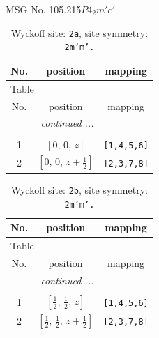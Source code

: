 \documentclass[fleqn,8pt]{jsarticle}
\begin{document}
\setcounter{MaxMatrixCols}{32}

\renewcommand{\tablename}{Table~}
\renewcommand{\figurename}{Figure~}
\begin{center}
\LARGE
MSG No. 105.215\quad$P4_{2}m'c'$
\end{center}
\renewcommand{\arraystretch}{1.2}
\begin{longtable}{ccc}
\caption{Wyckoff site: {\tt 2a}, site symmetry: {\tt 2m'm'.}}
 \\
 \hline \hline
No. & position & mapping \\ \hline \endfirsthead

\multicolumn{2}{l}{\tablename\ \thetable{}} \\
 \hline \hline
No. & position & mapping \\ \hline \endhead

 \hline \hline
\multicolumn{2}{r}{\footnotesize\it continued ...} \\ \endfoot

 \hline \hline
\multicolumn{2}{r}{} \\ \endlastfoot

1 & $\left[ 0,\, 0,\, z \right]$ & {\tt [1,4,5,6]} \\ \hline
2 & $\left[ 0,\, 0,\, z + \frac{1}{2} \right]$ & {\tt [2,3,7,8]} \\
\end{longtable}
\renewcommand{\arraystretch}{1.2}
\begin{longtable}{ccc}
\caption{Wyckoff site: {\tt 2b}, site symmetry: {\tt 2m'm'.}}
 \\
 \hline \hline
No. & position & mapping \\ \hline \endfirsthead

\multicolumn{2}{l}{\tablename\ \thetable{}} \\
 \hline \hline
No. & position & mapping \\ \hline \endhead

 \hline \hline
\multicolumn{2}{r}{\footnotesize\it continued ...} \\ \endfoot

 \hline \hline
\multicolumn{2}{r}{} \\ \endlastfoot

1 & $\left[ \frac{1}{2},\, \frac{1}{2},\, z \right]$ & {\tt [1,4,5,6]} \\ \hline
2 & $\left[ \frac{1}{2},\, \frac{1}{2},\, z + \frac{1}{2} \right]$ & {\tt [2,3,7,8]} \\
\end{longtable}
\end{document}

